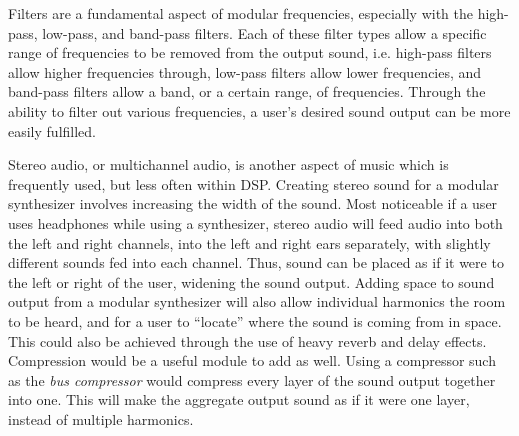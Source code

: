 Filters are a fundamental aspect of modular frequencies, especially with the high-pass, low-pass, and band-pass filters. Each of these filter types allow a specific range of frequencies to be removed from the output sound, i.e. high-pass filters allow higher frequencies through, low-pass filters allow lower frequencies, and band-pass filters allow a band, or a certain range, of frequencies. Through the ability to filter out various frequencies, a user's desired sound output can be more easily fulfilled. 

Stereo audio, or multichannel audio, is another aspect of music which is frequently used, but less often within DSP. Creating stereo sound for a modular synthesizer involves increasing the width of the sound. Most noticeable if a user uses headphones while using a synthesizer, stereo audio will feed audio into both the left and right channels, into the left and right ears separately, with slightly different sounds fed into each channel. Thus, sound can be placed as if it were to the left or right of the user, widening the sound output. Adding space to sound output from a modular synthesizer will also allow individual harmonics the room to be heard, and for a user to ``locate'' where the sound is coming from in space. This could also be achieved through the use of heavy reverb and delay effects. Compression would be a useful module to add as well. Using a compressor such as the \textit{bus compressor} would compress every layer of the sound output together into one. This will make the aggregate output sound as if it were one layer, instead of multiple harmonics.